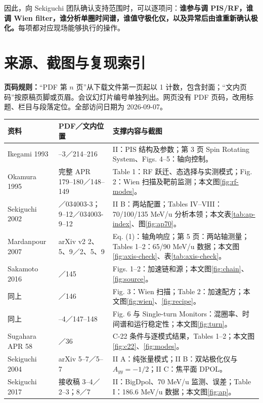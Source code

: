 \documentclass[UTF8,11pt,a4paper,fontset=none]{ctexart}
\begin{document}
因此，向 Sekiguchi 团队确认支持范围时，可以逐项问：\textbf{谁参与调 PIS/RF，谁调 Wien filter，谁分析单圈时间谱，谁值守极化仪，以及异常后由谁重新确认极化。}每项都对应现场能够执行的操作。

\clearpage
\section{来源、截图与复现索引}
\label{sec:locators}
\textbf{页码规则：}“PDF 第 $n$ 页”从下载文件第一页起以 1 计数，包含封面；“文内页码”按原稿页脚或页眉。会议幻灯片编号单独列出。网页没有 PDF 页码，改用标题、栏目与段落定位。全部访问日期为 2026-09-07。

\begin{longtable}{>{\raggedright\arraybackslash}p{30mm}>{\raggedright\arraybackslash}p{32mm}>{\raggedright\arraybackslash}p{88mm}}
\toprule 资料 & PDF／文内位置 & 支撑内容与截图 \\\midrule\endhead
Ikegami 1993\cite{Ikegami1993} & 1--3／214--216 & II：PIS 结构及参数；第 3 页 Spin Rotating System、Figs. 4--5：轴向控制。\\
Okamura 1995\cite{Okamura1995} & 完整 APR 179--180／148--149 & Table 1：RF 跃迁、态选择与实测模式；Fig. 2：Wien 扫描及靶前监测；本文图\ref{fig:rf-modes}。\\
Sekiguchi 2002\cite{Sekiguchi2002} & 3／034003-3；9--12／034003-9--12 & II B：两站配置；Tables IV--VIII：70/100/135 MeV/u 分析本领；本文表\ref{tab:ap-index}、图\ref{fig:ap70}。\\
Mardanpour 2007\cite{Mardanpour2007} & arXiv v2 2、5、9／2、5、9 & Eq. (1)：轴角响应；第 5 页：两站轴测量；Tables 1--2：65/90 MeV/u 数据；本文图\ref{fig:axis-check}、表\ref{tab:axis-check}。\\
Sakamoto 2016\cite{Sakamoto2016} & 1／145 & Figs. 1--2：加速链和源；本文图\ref{fig:chain}、\ref{fig:source}。\\
同上 & 2／146 & Fig. 3：Wien 扫描；Table 2：加速配方；本文图\ref{fig:wien}、\ref{fig:recipe}。\\
同上 & 3--4／147--148 & Fig. 6 与 Single-turn Monitors：混圈率、时间谱和运行稳定性；本文图\ref{fig:turn}。\\
Sugahara APR 58\cite{Sugahara2025} & 1／36 & C-22 条件与逐模式结果，Tables 1--2；本文图\ref{fig:c22}、\ref{fig:modes}。\\
Sekiguchi 2004\cite{Sekiguchi2004} & arXiv 5--7／5--7 & II A：纯张量模式；II B：双站极化仪与 $A_{yy}=-1/2$；II C：焦平面 DPOL。\\
Sekiguchi 2017\cite{Sekiguchi2017} & 接收稿 3--4／2--3；8／7 & II：BigDpol、70 MeV/u 监测、误差；Table I：186.6 MeV/u 数据；本文图\ref{fig:ap}。\\

\end{longtable}
\end{document}
